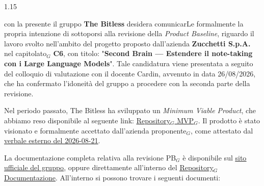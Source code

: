 \documentclass[a4paper, 11pt]{article}
\let\orighref\href
\renewcommand{\href}[2]{\orighref{#1}{\uline{#2}}}
\begin{document}
\vspace{0.4cm}
\begin{spacing}{1.15}

\noindent con la presente il gruppo \textbf{The Bitless} desidera comunicarLe formalmente la propria intenzione di sottoporsi alla revisione della \textit{Product Baseline}, riguardo il lavoro svolto nell'ambito del progetto proposto dall'azienda \textbf{Zucchetti S.p.A.} nel capitolato$_G$ \textbf{C6}, con titolo: "\textbf{Second Brain --- Estendere il note-taking con i Large Language Models}". Tale candidatura viene presentata a seguito del colloquio di valutazione con il docente Cardin, avvenuto in data 26/08/2026, che ha confermato l'idoneità del gruppo a procedere con la seconda parte della revisione.

\vspace{0.2cm}

\noindent Nel periodo passato, The Bitless ha sviluppato un \textit{Minimum Viable Product}, che abbiamo reso disponibile al seguente link: \href{https://github.com/thebitless-group-swe/MVP}{Repository$_G$ MVP$_G$}. Il prodotto è stato visionato e formalmente accettato dall'azienda proponente$_G$, come attestato dal \href{https://thebitless.live/PB/doc_esterna/verbali/VE_2026-08-21_approvazione-mvp/VE_2026-08-21_approvazione-mvp.pdf}{verbale esterno del 2026-08-21}.

\vspace{0.2cm}

\noindent La documentazione completa relativa alla revisione PB$_G$ è disponibile sul \href{https://thebitless.live}{sito ufficiale del gruppo}, oppure direttamente all'interno del \href{https://github.com/thebitless-group-swe/thebitless.github.io}{Repository$_G$ Documentazione}. All'interno si possono trovare i seguenti documenti:


\end{spacing}
\end{document}
